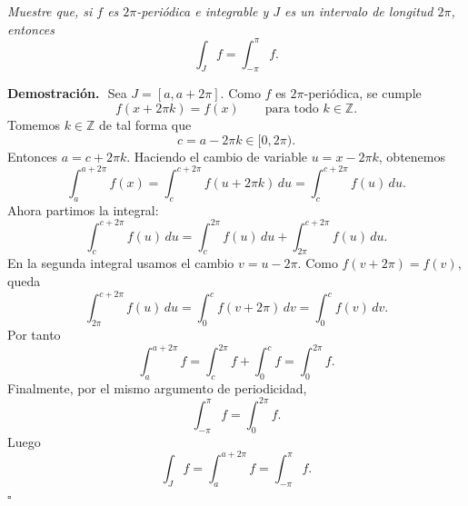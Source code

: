 \documentclass[11pt,letterpaper]{article}
\newcommand{\Z}{\mathbb{Z}}
\begin{document}
\begin{tcolorbox}[title=\textcolor{white}{Problema 2}]
\textit{Muestre que, si $f$ es $2\pi$-periódica e integrable y $J$ es un intervalo de longitud $2\pi$, entonces}
\begin{equation*}
    \int_J f=\int_{-\pi}^{\pi}f.
\end{equation*}
\end{tcolorbox}
\textbf{Demostración.}\,\
Sea $J=[a,a+2\pi]$. Como $f$ es $2\pi$-periódica, se cumple
\begin{equation*}
    f(x+2\pi k)=f(x)\qquad \text{para todo }k\in\Z.
\end{equation*}
Tomemos $k\in\Z$ de tal forma que
\begin{equation*}
    c=a-2\pi k\in[0,2\pi).
\end{equation*}
Entonces $a=c+2\pi k$. Haciendo el cambio de variable $u=x-2\pi k$, obtenemos
\begin{equation*}
    \int_a^{a+2\pi} f(x)
    =\int_c^{c+2\pi} f(u+2\pi k)\,du
    =\int_c^{c+2\pi} f(u)\,du.
\end{equation*}
Ahora partimos la integral:
\begin{equation*}
    \int_c^{c+2\pi} f(u)\,du
    =\int_c^{2\pi} f(u)\,du+\int_{2\pi}^{c+2\pi} f(u)\,du.
\end{equation*}
En la segunda integral usamos el cambio $v=u-2\pi$. Como $f(v+2\pi)=f(v)$, queda
\begin{equation*}
    \int_{2\pi}^{c+2\pi} f(u)\,du
    =\int_0^c f(v+2\pi)\,dv
    =\int_0^c f(v)\,dv.
\end{equation*}
Por tanto
\begin{equation*}
    \int_a^{a+2\pi} f
    =\int_c^{2\pi}f+\int_0^c f
    =\int_0^{2\pi} f.
\end{equation*}
Finalmente, por el mismo argumento de periodicidad,
\begin{equation*}
    \int_{-\pi}^{\pi} f
    =\int_0^{2\pi} f.
\end{equation*}
Luego
\begin{equation*}
    \int_J f=\int_a^{a+2\pi}f=\int_{-\pi}^{\pi}f.
\end{equation*}
\hfill $\square$

\newpage
\end{document}
